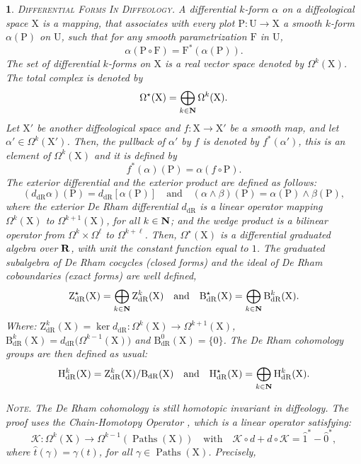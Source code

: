 \documentclass[12pt,reqno]{amsart}
\theoremstyle{article}
\newtheorem{article}{}
\def\artlabel[#1]{\textsc{#1}.}
\def \B{\mathrm B}
\def \F{\mathrm F}
\def \H{\mathrm H}
\def \P{\mathrm P}
\def \U{\mathrm U}
\def \X{\mathrm X}
\def \Z{\mathrm Z}
\newcommand{\NN}{{\bf N}}
\newcommand{\RR}{{\bf R}}
\newcommand{\cK}{{\mathcal K}}
\newcommand{\dR}{\mathrm{dR}}
\DeclareMathOperator{\Paths}{Paths}
\def \H{\mathrm H}
\begin{document}
  \begin{article}\artlabel[Differential Forms In Diffeology]
    \label{Differential-forms-in-diffeology}
    {A \emph{differential $k$-form} $\alpha$ on a diffeological space $\X$ is a mapping,
    that associates with every plot $\P \colon \U \to \X$ a smooth $k$-form $\alpha(\P)$ on $\U$,
    such that for any smooth parametrization $\F$ in $\U$,
    $$
    \alpha(\P \circ \F) = \F^*(\alpha(\P)).
    $$}
    The set of differential $k$-forms on $\X$ is a real vector space denoted by $\Omega^k(\X)$.
    The total complex is denoted by
    $$
    \Omega^\star(\X) = \bigoplus_{k \in \NN} \Omega^k(\X).
    $$
    Let $\X'$ be another diffeological space and $f \colon \X \to \X'$ be a smooth map,
    and let $\alpha' \in \Omega^k(\X')$.
    Then,
    the pullback of $\alpha'$ by $f$ is denoted by $f^*(\alpha')$,
    this is an element of $\Omega^k(\X)$ and it is defined by
    $$
    f^*(\alpha)(\P) = \alpha(f \circ \P).
    $$
    The exterior differential and the exterior product are defined as follows:
    $$
    (d_\dR\alpha)(\P) = d_\dR[\alpha(\P)]
    \quad \text{and} \quad
    (\alpha \wedge \beta)(\P) = \alpha(\P) \wedge \beta(\P),
    $$
    where the exterior De Rham differential $d_\dR$ is a linear operator mapping $\Omega^k(\X)$ to $\Omega^{k+1}(\X)$,
    for all $k \in \NN$;
    and the wedge product is a bilinear operator from $\Omega^k \times \Omega^\ell$ to $\Omega^{k+\ell}$.
    Then,
    $\Omega^\star(\X)$ is a differential graduated algebra over $\RR$,
    with unit the constant function equal to $1$.
    The graduated subalgebra of De Rham cocycles (closed forms) and the ideal of De Rham coboundaries (exact forms) are well defined,
    $$
    \Z_\dR^\star(\X) = \bigoplus_{k \in \NN} \Z_\dR^k(\X)
    \quad \text{and} \quad
    \B_\dR^\star(\X) = \bigoplus_{k \in \NN} \B_\dR^k(\X).
    $$
    Where:
    $\Z_\dR^k(\X) = \ker d_\dR \colon \Omega^k(\X) \to \Omega^{k+1}(\X)$,
    $\B_\dR^k(\X) = d_\dR\big(\Omega^{k-1}(\X)\big)$ and $\B_\dR^0(\X) =\{0\}$.
    The De Rham cohomology groups are then defined as usual:
    $$
    \H^k_\dR(\X) = \Z^k_\dR(\X)/\B_\dR(\X)
    \quad \text{and} \quad
    \H_\dR^\star(\X) = \bigoplus_{k \in \NN} \H^k_\dR(\X).
    $$
    
    \textsc{Note.} The De Rham cohomology is still homotopic invariant in diffeology.
    The proof uses the \emph{Chain-Homotopy Operator} \cite[]{PIZ13},
    which is a linear operator satisfying:
    $$
    \cK \colon \Omega^k(\X) \to \Omega^{k-1}(\Paths(\X))
    \quad \text{with} \quad
    \cK \circ d + d \circ \cK = \hat 1^* - \hat 0^*,
    $$
    where $\hat t(\gamma) = \gamma(t)$,
    for all $\gamma \in \Paths(\X)$.
    Precisely,
    

\end{article}
\end{document}
